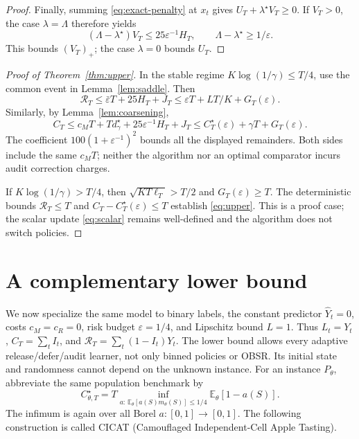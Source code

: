 \documentclass[11pt]{article}
\theoremstyle{remark}
\newcommand{\E}{\mathbb E}
\newcommand{\calR}{\mathcal R}
\newcommand{\eps}{\varepsilon}
\begin{document}
\begin{proof}
Finally, summing \eqref{eq:exact-penalty} at $x_t$ gives
$U_T+\lambda^\star V_T\ge0$. If $V_T>0$, the case $\lambda=\Lambda$
therefore yields
\[
 (\Lambda-\lambda^\star)V_T\le25\eps^{-1}H_T,
 \qquad \Lambda-\lambda^\star\ge1/\eps.
\]
This bounds $(V_T)_+$; the case $\lambda=0$ bounds $U_T$.
\end{proof}

\begin{proof}[Proof of Theorem~\ref{thm:upper}]
In the stable regime $K\log(1/\gamma)\le T/4$, use the common
event in Lemma~\ref{lem:saddle}. Then
\[
 \calR_T\le\bar\eps T+25H_T+J_T
 \le\eps T+LT/K+G_T(\eps).
\]
Similarly, by Lemma~\ref{lem:coarsening},
\[
 C_T\le c_MT+Td_\gamma^\star+25\eps^{-1}H_T+J_T
 \le C_T^\star(\eps)+\gamma T+G_T(\eps).
\]
The coefficient $100(1+\eps^{-1})^2$ bounds all the displayed
remainders. Both sides include the same $c_MT$; neither the algorithm
nor an optimal comparator incurs audit correction charges.

If $K\log(1/\gamma)>T/4$, then
$\sqrt{KT\ell_T}>T/2$ and $G_T(\eps)\ge T$.
The deterministic bounds $\calR_T\le T$ and
$C_T-C_T^\star(\eps)\le T$ establish \eqref{eq:upper}.
This is a proof case; the scalar update \eqref{eq:scalar} remains
well-defined and the algorithm does not switch policies.
\end{proof}

\section{A complementary lower bound}
\label{sec:lower}

We now specialize the same model to binary labels, the constant predictor
$\widehat Y_t=0$, costs $c_M=c_R=0$, risk budget $\eps=1/4$, and
Lipschitz bound $L=1$. Thus $L_t=Y_t$, $C_T=\sum_tI_t$, and
$\calR_T=\sum_t(1-I_t)Y_t$. The lower bound allows every adaptive
release/defer/audit learner, not only binned policies or OBSR. Its initial
state and randomness cannot depend on the unknown instance. For an
instance $P_\theta$, abbreviate the same population benchmark by
\begin{equation}
 C^\star_{\theta,T}
 =T\inf_{a:\,\E_\theta[a(S)m_\theta(S)]\le1/4}
                \E_\theta[1-a(S)].
 \label{eq:benchmark}
\end{equation}
The infimum is again over all Borel $a:[0,1]\to[0,1]$. The following
construction is called CICAT (Camouflaged Independent-Cell Apple Tasting).
\end{document}
